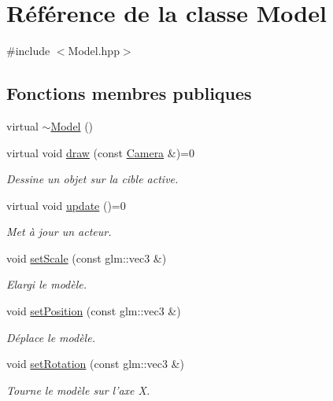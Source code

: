 \hypertarget{classModel}{\section{Référence de la classe Model}
\label{classModel}
}


{\ttfamily \#include $<$Model.\+hpp$>$}

\subsection*{Fonctions membres publiques}
\begin{DoxyCompactItemize}
\item 
virtual \hyperlink{classModel_ad6ebd2062a0b823db841a0b88baac4c0}{$\sim$\+Model} ()
\item 
virtual void \hyperlink{classModel_a7df7bb611f0503bc01946fff87b68fba}{draw} (const \hyperlink{classCamera}{Camera} \&)=0
\begin{DoxyCompactList}\small\item\em Dessine un objet sur la cible active. \end{DoxyCompactList}\item 
virtual void \hyperlink{classModel_a4355afeacef658e098706cba1dd37118}{update} ()=0
\begin{DoxyCompactList}\small\item\em Met à jour un acteur. \end{DoxyCompactList}\item 
void \hyperlink{classModel_a5714a558b8e85b9e86c91782d7ef5ba5}{set\+Scale} (const glm\+::vec3 \&)
\begin{DoxyCompactList}\small\item\em Elargi le modèle. \end{DoxyCompactList}\item 
void \hyperlink{classModel_a5ad6354ec2a10f6866485b04172a2be5}{set\+Position} (const glm\+::vec3 \&)
\begin{DoxyCompactList}\small\item\em Déplace le modèle. \end{DoxyCompactList}\item 
void \hyperlink{classModel_a41649d6e7b259cfdb362a57d14191b91}{set\+Rotation} (const glm\+::vec3 \&)
\begin{DoxyCompactList}\small\item\em Tourne le modèle sur l'axe X. \end{DoxyCompactList}\end{DoxyCompactItemize}
